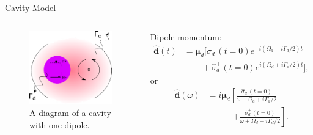 \documentclass{beamer}
\begin{document}
\begin{frame}{Cavity Model}
\begin{columns}
 \begin{figure}[htp]%
  \centering
 \begin{center}
 \includegraphics[width=0.99\textwidth]{./Figs/Cavity_withDipoleT}%
 \end{center}
 \caption[A diagram of a cavity with one dipole.]{A diagram of a cavity with one dipole. }
 \label{Cavity_withDipoleT1}
 \end{figure}

\begin{center} %
\fontsize{9}{7.2}\selectfont
{Dipole momentum: 
 \begin{align}
 \hat{\mathbf{d}}(t) &={\bm \mu_d}[\hat{\sigma}_d^-(t=0) e^{-i(\Omega_d-i\Gamma_d/2) t}\nonumber \\
 &\quad\quad  +\hat{\sigma}_d^+(t=0)e^{i(\Omega_d+i\Gamma_d/2) t}],\label{eq:dt2}
 \end{align}
or
 \begin{align}
  \label{dipole}
   \hat{\mathbf{d}}(\omega) &=
 {i\bm\mu_d}\left [ \frac{\hat{\sigma}_d^-(t=0)}
 {\omega-\Omega_d+i\Gamma_d/2}\nonumber \right. \\ &\qquad\quad \left. +\frac{\hat{\sigma}_d^+(t=0)}{\omega+\Omega_d+i\Gamma_d/2}\right].
 \end{align}
 }
\end{center}
\end{columns}


\end{frame}
\end{document}
